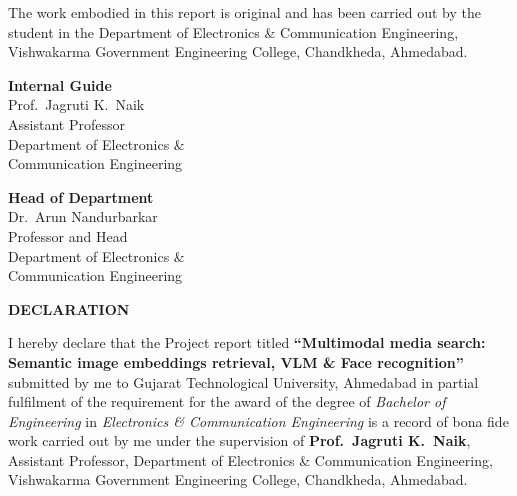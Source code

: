\documentclass[12pt,a4paper,oneside]{report}
\begin{document}
The work embodied in this report is original and has been carried out by the
student in the Department of Electronics \& Communication Engineering,
Vishwakarma Government Engineering College, Chandkheda, Ahmedabad.

\vspace{1.8cm}

\begin{singlespace}
\noindent
\begin{minipage}[t]{0.45\textwidth}
  \raggedright
  \textbf{Internal Guide}\\[0.8cm]
  Prof.\ Jagruti K.\ Naik\\
  Assistant Professor\\
  Department of Electronics \&\\
  Communication Engineering
\end{minipage}
\hfill
\begin{minipage}[t]{0.45\textwidth}
  \raggedleft
  \textbf{Head of Department}\\[0.8cm]
  Dr.\ Arun Nandurbarkar\\
  Professor and Head\\
  Department of Electronics \&\\
  Communication Engineering
\end{minipage}
\end{singlespace}

\clearpage
\thispagestyle{romanplain}

\vspace*{1cm}
{\centering\normalfont\bfseries\fontsize{16}{19.2}\selectfont
DECLARATION\par}
\vspace{20pt}

I hereby declare that the Project report titled
\textbf{``Multimodal media search: Semantic image embeddings retrieval,
VLM \& Face recognition''}
submitted by me to Gujarat Technological University, Ahmedabad in partial
fulfilment of the requirement for the award of the degree of
\textit{Bachelor of Engineering} in
\textit{Electronics \& Communication Engineering} is a record of bona fide
work carried out by me under the supervision of
\textbf{Prof.\ Jagruti K.\ Naik}, Assistant Professor, Department of
Electronics \& Communication Engineering, Vishwakarma Government Engineering
College, Chandkheda, Ahmedabad.
\end{document}
